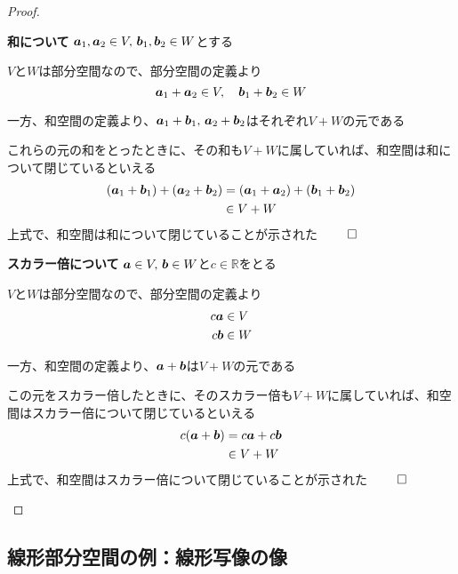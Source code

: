 \documentclass[../../../topic_linear-algebra]{subfiles}
\begin{document}
\begin{proof}
  \begin{subpattern}{\bfseries 和について}
    $\vb*{a}_1, \vb*{a}_2 \in V, \, \vb*{b}_1, \vb*{b}_2 \in W$とする

    $V$と$W$は部分空間なので、部分空間の定義より
    \begin{equation*}
      \vb*{a}_1 + \vb*{a}_2 \in V, \quad \vb*{b}_1 + \vb*{b}_2 \in W
    \end{equation*}

    一方、和空間の定義より、$\vb*{a}_1 + \vb*{b}_1,\, \vb*{a}_2 + \vb*{b}_2$はそれぞれ$V+W$の元である

    これらの元の和をとったときに、その和も$V + W$に属していれば、和空間は和について閉じているといえる
    \begin{align*}
      (\vb*{a}_1 + \vb*{b}_1) + (\vb*{a}_2 + \vb*{b}_2) & = (\vb*{a}_1 + \vb*{a}_2) + (\vb*{b}_1 + \vb*{b}_2) \\
                                                        & \in V + W
    \end{align*}
    上式で、和空間は和について閉じていることが示された $\qed$
  \end{subpattern}

  \begin{subpattern}{\bfseries スカラー倍について}
    $\vb*{a} \in V, \, \vb*{b} \in W$と$c \in \mathbb{R}$をとる

    $V$と$W$は部分空間なので、部分空間の定義より
    \begin{align*}
      c \vb*{a} & \in V \\
      c \vb*{b} & \in W
    \end{align*}

    一方、和空間の定義より、$\vb*{a} + \vb*{b}$は$V + W$の元である

    この元をスカラー倍したときに、そのスカラー倍も$V + W$に属していれば、和空間はスカラー倍について閉じているといえる
    \begin{align*}
      c(\vb*{a} + \vb*{b}) & = c \vb*{a} + c \vb*{b} \\
                           & \in V + W
    \end{align*}
    上式で、和空間はスカラー倍について閉じていることが示された $\qed$
  \end{subpattern}
\end{proof}

\subsection{線形部分空間の例：線形写像の像}
\end{document}
